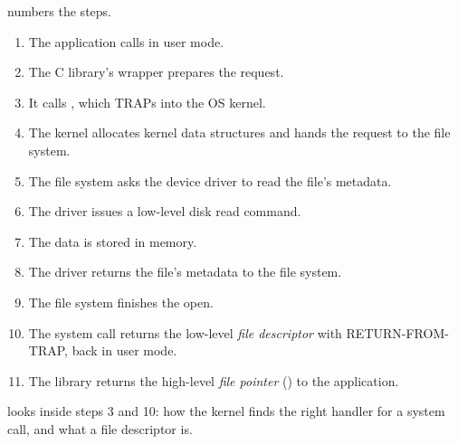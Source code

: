 \begin{example}
   numbers the steps.
  \begin{enumerate}
    \item The application calls  in user mode.
    \item The C library's wrapper prepares the request.
    \item It calls , which TRAPs into the OS kernel.
    \item The kernel allocates kernel data structures and hands the request to the file system.
    \item The file system asks the device driver to read the file's metadata.
    \item The driver issues a low-level disk read command.
    \item The data is stored in memory.
    \item The driver returns the file's metadata to the file system.
    \item The file system finishes the open.
    \item The system call returns the low-level \emph{file descriptor} with RETURN-FROM-TRAP, back in user mode.
    \item The library returns the high-level \emph{file pointer} () to the application.
  \end{enumerate}
\end{example}

 looks inside steps 3 and 10: how the kernel finds the right handler for a system call, and what a file descriptor is.
